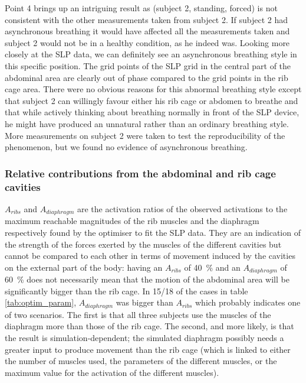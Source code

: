 Point 4 brings up an intriguing result as (subject 2, standing, forced) is not consistent with the other measurements taken from subject 2. If subject 2 had asynchronous breathing it would have affected all the measurements taken and subject 2 would not be in a healthy condition, as he indeed was. Looking more closely at the SLP data, we can definitely see an asynchronous breathing style in this specific position. The grid points of the SLP grid in the central part of the abdominal area are clearly out of phase compared to the grid points in the rib cage area. There were no obvious reasons for this abnormal breathing style except that subject 2 can willingly favour either his rib cage or abdomen to breathe and that while actively thinking about breathing normally in front of the SLP device, he might have produced an unnatural rather than an ordinary breathing style. More measurements on subject 2 were taken to test the reproducibility of the phenomenon, but we found no evidence of asynchronous breathing.

\subsubsection{Relative contributions from the abdominal and rib cage cavities}
$A_{ribs}$ and $A_{diaphragm}$ are the activation ratios of the observed activations to the maximum reachable magnitudes of the rib muscles and the diaphragm respectively found by the optimiser to fit the SLP data. They are an indication of the strength of the forces exerted by the muscles of the different cavities but cannot be compared to each other in terms of movement induced by the cavities on the external part of the body: having an $A_{ribs}$ of 40~\% and an $A_{diaphragm}$ of 60~\% does not necessarily mean that the motion of the abdominal area will be significantly bigger than the rib cage. In 15/18 of the cases in table \ref{tab:optim_param}, $A_{diaphragm}$ was bigger than $A_{ribs}$ which probably indicates one of two scenarios. The first is that all three subjects use the muscles of the diaphragm more than those of the rib cage. The second, and more likely, is that the result is simulation-dependent; the simulated diaphragm possibly needs a greater input to produce movement than the rib cage (which is linked to either the number of muscles used, the parameters of the different muscles, or the maximum value for the activation of the different muscles).

